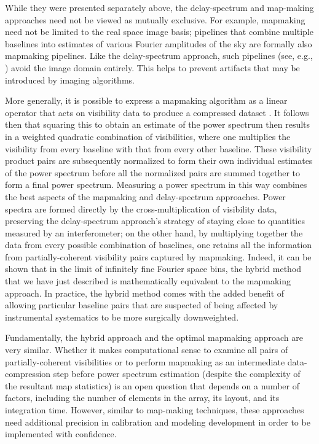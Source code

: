 \documentclass[preprint,11pt]{aastex}
\begin{document}
While they were presented separately above, the delay-spectrum and map-making approaches need not be viewed as mutually exclusive. For example, mapmaking need not be limited to the real space image basis; pipelines that combine multiple baselines into estimates of various Fourier amplitudes of the sky are formally also mapmaking pipelines. Like the delay-spectrum approach, such pipelines (see, e.g., \citealt{trott_et_al2016}) avoid the image domain entirely. This helps to prevent artifacts that may be introduced by imaging algorithms.

More generally, it is possible to express a mapmaking algorithm as a linear operator that acts on visibility data to produce a compressed dataset \citep{dillon_et_al2015a}. It follows then that squaring this to obtain an estimate of the power spectrum then results in a weighted quadratic combination of visibilities, where one multiplies the visibility from every baseline with that from every other baseline. These visibility product pairs are subsequently normalized to form their own individual estimates of the power spectrum before all the normalized pairs are summed together to form a final power spectrum. Measuring a power spectrum in this way combines the best aspects of the mapmaking and delay-spectrum approaches. Power spectra are formed directly by the cross-multiplication of visibility data, preserving the delay-spectrum approach's strategy of staying close to quantities measured by an interferometer; on the other hand, by multiplying together the data from every possible combination of baselines, one retains all the information from partially-coherent visibility pairs captured by mapmaking. Indeed, it can be shown \citep{liu_et_al2014a} that in the limit of infinitely fine Fourier space bins, the hybrid method that we have just described is mathematically equivalent to the mapmaking approach. In practice, the hybrid method comes with the added benefit of allowing particular baseline pairs that are suspected of being affected by instrumental systematics to be more surgically downweighted. 

Fundamentally, the hybrid approach and the optimal mapmaking approach \citep{dillon_et_al2015a} are very similar. Whether it makes computational sense to examine all pairs of partially-coherent visibilities or to perform mapmaking as an intermediate data-compression step before power spectrum estimation (despite the complexity of the resultant map statistics) is an open question that depends on a number of factors, including the number of elements in the array, its layout, and its integration time.
However, similar to map-making techniques, these approaches need additional precision in calibration and modeling development in order to be implemented with confidence.
\end{document}
